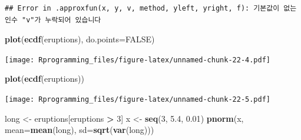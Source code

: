 \documentclass[10pt,]{krantz}
\makeatletter
\newenvironment{Shaded}{\begin{snugshade}}{\end{snugshade}}
\newcommand{\KeywordTok}[1]{\textcolor[rgb]{0.13,0.29,0.53}{\textbf{#1}}}
\newcommand{\DataTypeTok}[1]{\textcolor[rgb]{0.13,0.29,0.53}{#1}}
\newcommand{\DecValTok}[1]{\textcolor[rgb]{0.00,0.00,0.81}{#1}}
\newcommand{\FloatTok}[1]{\textcolor[rgb]{0.00,0.00,0.81}{#1}}
\newcommand{\StringTok}[1]{\textcolor[rgb]{0.31,0.60,0.02}{#1}}
\newcommand{\OtherTok}[1]{\textcolor[rgb]{0.56,0.35,0.01}{#1}}
\newcommand{\OperatorTok}[1]{\textcolor[rgb]{0.81,0.36,0.00}{\textbf{#1}}}
\newcommand{\NormalTok}[1]{#1}
\newenvironment{kframe}{%
\medskip{}
\setlength{\fboxsep}{.8em}
 \def\at@end@of@kframe{}%
 \ifinner\ifhmode%
  \def\at@end@of@kframe{\end{minipage}}%
  \begin{minipage}{\columnwidth}%
 \fi\fi%
 \def\FrameCommand##1{\hskip\@totalleftmargin \hskip-\fboxsep
 \colorbox{shadecolor}{##1}\hskip-\fboxsep
     \hskip-\linewidth \hskip-\@totalleftmargin \hskip\columnwidth}%
 \MakeFramed {\advance\hsize-\width
   \@totalleftmargin\z@ \linewidth\hsize
   \@setminipage}}%
 {\par\unskip\endMakeFramed%
 \at@end@of@kframe}
\renewenvironment{Shaded}{\begin{kframe}}{\end{kframe}}
\makeatother
\begin{document}
\begin{verbatim}
## Error in .approxfun(x, y, v, method, yleft, yright, f): 기본값이 없는 인수 "v"가 누락되어 있습니다
\end{verbatim}

\begin{Shaded}
\begin{Highlighting}[]
\KeywordTok{plot}\NormalTok{(}\KeywordTok{ecdf}\NormalTok{(eruptions), }\DataTypeTok{do.points=}\OtherTok{FALSE}\NormalTok{)}
\end{Highlighting}
\end{Shaded}

\texttt{[image: Rprogramming\_files/figure-latex/unnamed-chunk-22-4.pdf]}

\begin{Shaded}
\begin{Highlighting}[]
\KeywordTok{plot}\NormalTok{(}\KeywordTok{ecdf}\NormalTok{(eruptions))}
\end{Highlighting}
\end{Shaded}

\texttt{[image: Rprogramming\_files/figure-latex/unnamed-chunk-22-5.pdf]}

\begin{Shaded}
\begin{Highlighting}[]
\NormalTok{long <-}\StringTok{ }\NormalTok{eruptions[eruptions }\OperatorTok{>}\StringTok{ }\DecValTok{3}\NormalTok{]}
\NormalTok{x <-}\StringTok{ }\KeywordTok{seq}\NormalTok{(}\DecValTok{3}\NormalTok{, }\FloatTok{5.4}\NormalTok{, }\FloatTok{0.01}\NormalTok{)}
\KeywordTok{pnorm}\NormalTok{(x, }\DataTypeTok{mean=}\KeywordTok{mean}\NormalTok{(long), }\DataTypeTok{sd=}\KeywordTok{sqrt}\NormalTok{(}\KeywordTok{var}\NormalTok{(long)))}
\end{Highlighting}
\end{Shaded}
\end{document}
